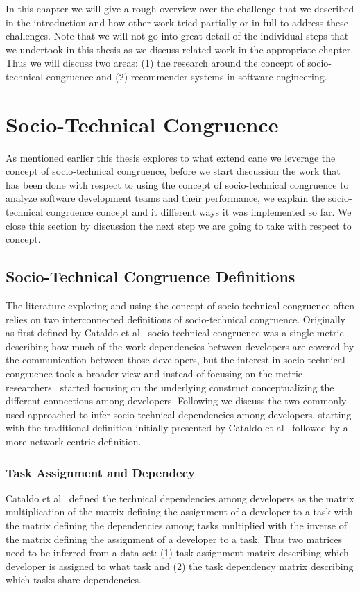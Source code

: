 In this chapter we will give a rough overview over the challenge that we described in the introduction and how other work tried partially or in full to address these challenges.
Note that we will not go into great detail of the individual steps that we undertook in this thesis as we discuss related work in the appropriate chapter.
Thus we will discuss two areas: (1) the research around the concept of socio-technical congruence and (2) recommender systems in software engineering.

\section{Socio-Technical Congruence}
As mentioned earlier this thesis explores to what extend cane we leverage the concept of socio-technical congruence, before we start discussion the work that has been done with respect to using the concept of socio-technical congruence to analyze software development teams and their performance, we explain the socio-technical congruence concept and it different ways it was implemented so far.
We close this section by discussion the next step we are going to take with respect to concept.

\subsection{Socio-Technical Congruence Definitions}
The literature exploring and using the concept of socio-technical congruence often relies on two interconnected definitions of socio-technical congruence.
Originally as first defined by Cataldo et al~\cite{cataldo:cscw:2006} socio-technical congruence was a single metric describing how much of the work dependencies between developers are covered by the communication between those developers, but the interest in socio-technical congruence took a broader view and instead of focusing on the metric researchers~\cite{} started focusing on the underlying construct conceptualizing the different connections among developers.
Following we discuss the two commonly used approached to infer socio-technical dependencies among developers, starting with the traditional definition initially presented by Cataldo et al~\cite{cataldo:cscw:2006} followed by a more network centric definition.

\subsubsection{Task Assignment and Dependecy}
Cataldo et al~\cite{cataldo:cscw:2006} defined the technical dependencies among developers as the matrix multiplication of the matrix defining the assignment of a developer to a task with the matrix defining the dependencies among tasks multiplied with the inverse of the matrix defining the assignment of a developer to a task.
Thus two matrices need to be inferred from a data set: (1) task assignment matrix describing which developer is assigned to what task and (2) the task dependency matrix describing which tasks share dependencies.

